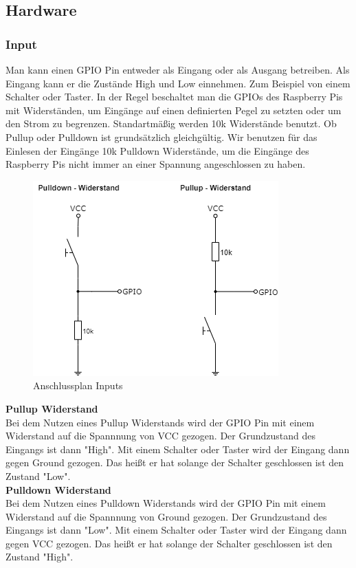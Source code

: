 \subsection{Hardware}

\subsubsection{Input}

Man kann einen GPIO Pin entweder als Eingang oder als Ausgang betreiben. Als Eingang kann er die Zustände High und Low einnehmen. Zum Beispiel von einem Schalter oder Taster. In der Regel beschaltet man die GPIOs des Raspberry Pis mit Widerständen, um Eingänge auf einen definierten Pegel zu setzten oder um den Strom zu begrenzen. Standartmäßig werden 10k Widerstände benutzt. Ob Pullup oder Pulldown ist grundsätzlich gleichgültig. Wir benutzen für das Einlesen der Eingänge 10k Pulldown Widerstände, um die Eingänge des Raspberry Pis nicht immer an einer Spannung angeschlossen zu haben.

\begin{figure}[H]
	\begin{center}
		\includegraphics[scale=0.8]{figures/hcis/input.png}
			\caption{Anschlussplan Inputs}
			\label{fig:input}
	\end{center}
\end{figure}

\textbf{Pullup Widerstand}\\
Bei dem Nutzen eines Pullup Widerstands wird der GPIO Pin mit einem Widerstand auf die Spannnung von VCC gezogen. Der Grundzustand des Eingangs ist dann "High". Mit einem Schalter oder Taster wird der Eingang dann gegen Ground gezogen. Das heißt er hat solange der Schalter geschlossen ist den Zustand "Low".\\\medskip
\textbf{Pulldown Widerstand}\\
Bei dem Nutzen eines Pulldown Widerstands wird der GPIO Pin mit einem Widerstand auf die Spannnung von Ground gezogen. Der Grundzustand des Eingangs ist dann "Low". Mit einem Schalter oder Taster wird der Eingang dann gegen VCC gezogen. Das heißt er hat solange der Schalter geschlossen ist den Zustand "High".

